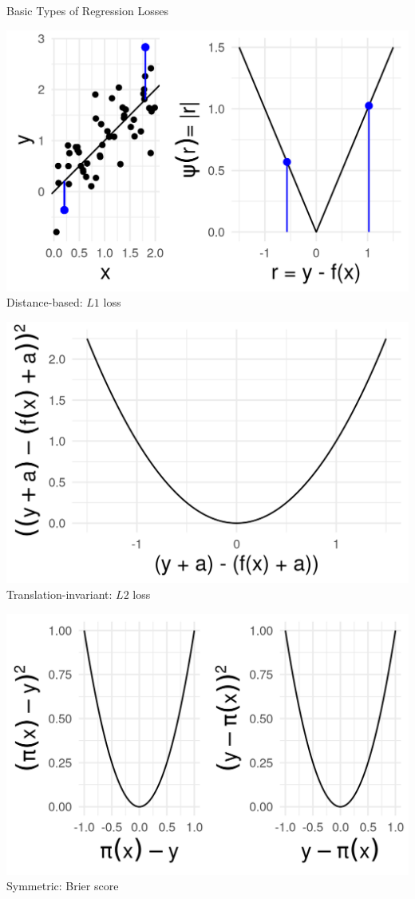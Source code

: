 \begin{vbframe}{Basic Types of Regression Losses}
\begin{minipage}[b]{0.33\textwidth}
  \includegraphics[width=\textwidth]{figure/loss_dist_based}
  \footnotesize \centering
  Distance-based: $L1$ loss
\end{minipage}%
\begin{minipage}[b]{0.33\textwidth}
  \includegraphics[width=\textwidth]{figure/loss_transl_inv.png}
  \footnotesize \centering
  Translation-invariant: $L2$ loss
\end{minipage}%
\begin{minipage}[b]{0.33\textwidth}
  \includegraphics[width=\textwidth]{figure/loss_symmetric}
  \footnotesize \centering
  Symmetric: Brier score
\end{minipage}

\end{vbframe}

